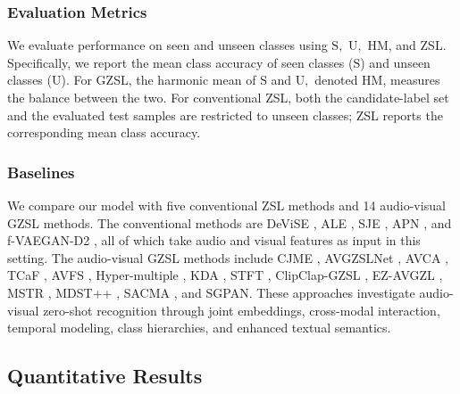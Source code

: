\subsubsection{Evaluation Metrics}\label{sec:evaluation-metrics}

We evaluate performance on seen and unseen classes using $\text{S},$ $\text{U},$ HM, and ZSL. Specifically, we report the mean class accuracy of seen classes ($\text{S}$) and unseen classes ($\text{U}$). For GZSL, the harmonic mean of $\text{S}$ and $\text{U},$ denoted HM, measures the balance between the two. For conventional ZSL, both the candidate-label set and the evaluated test samples are restricted to unseen classes; ZSL reports the corresponding mean class accuracy.

\subsubsection{Baselines}\label{sec:baselines}

We compare our model with five conventional ZSL methods and 14 audio-visual GZSL methods. The conventional methods are DeViSE \cite{frome2013devise}, ALE \cite{akata2016ale}, SJE \cite{akata2015sje}, APN \cite{xu2020apn}, and f-VAEGAN-D2 \cite{xian2019fvaegan}, all of which take audio and visual features as input in this setting. The audio-visual GZSL methods include CJME \cite{parida2020cjme}, AVGZSLNet \cite{mazumder2021avgzslnet}, AVCA \cite{mercea2022avca}, TCaF \cite{mercea2022tcaf}, AVFS \cite{zheng2023avfs}, Hyper-multiple \cite{hong2023hyperbolic}, KDA \cite{chen2023kda}, STFT \cite{li2024stft}, ClipClap-GZSL \cite{kurzendorfer2024clipclap}, EZ-AVGZL \cite{mo2024easy}, MSTR \cite{yang2025mstr}, MDST++ \cite{li2025mdst}, SACMA \cite{yang2026sacma}, and SGPAN. These approaches investigate audio-visual zero-shot recognition through joint embeddings, cross-modal interaction, temporal modeling, class hierarchies, and enhanced textual semantics.

\subsection{Quantitative Results}\label{sec:quantitative-results}


